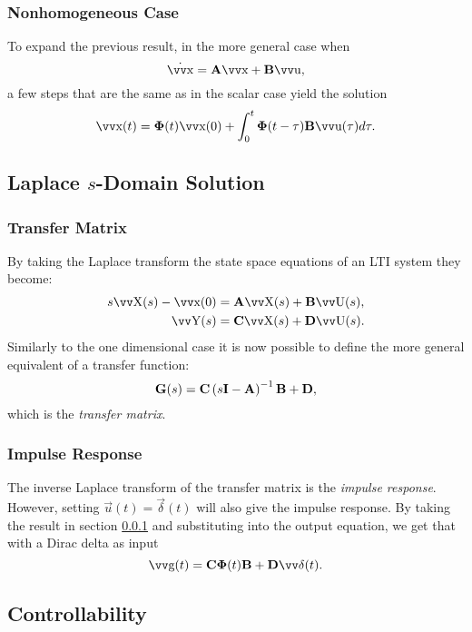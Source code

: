 \subsubsection{Nonhomogeneous Case} \label{sec:ss-sol-time-nonh}

To expand the previous result, in the more general case when
\[
	\dot{\vec{x}} = \mx{A} \vec{x} + \mx{B} \vec{u},
\]
a few steps that are the same as in the scalar case yield the solution
\[
	\vec{x}(t) = \mx{\Phi}(t) \vec{x}(0)
		+ \int_0^t \mx{\Phi}(t - \tau) \mx{B} \vec{u}(\tau) d\tau.
\]

\subsection{Laplace \(s\)-Domain Solution}

\subsubsection{Transfer Matrix}

By taking the Laplace transform the state space equations of an LTI system they become:
\begin{align*}
	s\vec{X}(s) - \vec{x}(0) & = \mx{A} \vec{X}(s) + \mx{B} \vec{U}(s), \\
	\vec{Y}(s)              & = \mx{C} \vec{X}(s) + \mx{D} \vec{U}(s).
\end{align*}
Similarly to the one dimensional case it is now possible to define the more general equivalent of a transfer function:
\[
	\bm{\mathrm{G}}(s) = \bm{\mathrm{C}}\left(s\bm{\mathrm{I}} - \bm{\mathrm{A}}\right)^{-1} \bm{\mathrm{B}} + \bm{\mathrm{D}},
\]
which is the \emph{transfer matrix}.

\subsubsection{Impulse Response}

The inverse Laplace transform of the transfer matrix is the \emph{impulse response}. However, setting \(\vec{u}(t) = \vec{\delta}(t)\) will also give the impulse response. By taking the result in section \ref{sec:ss-sol-time-nonh} and substituting into the output equation, we get that with a Dirac delta as input
\[
	\vec{g}(t) = \mx{C} \mx{\Phi}(t) \mx{B} + \mx{D} \vec{\delta}(t).
\]

\subsection{Controllability}

